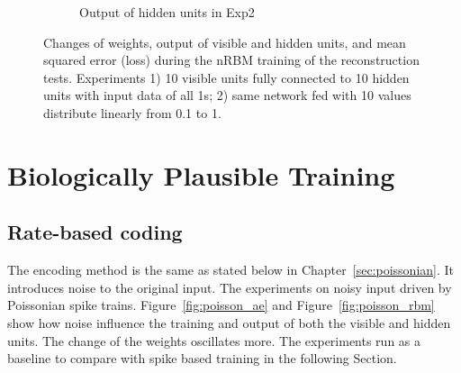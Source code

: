 \begin{figure}
\begin{subfigure}[t]{0.4\textwidth}
		\caption{Output of hidden units in Exp2}
	\end{subfigure}
	\caption{Changes of weights, output of visible and hidden units, and mean squared error (loss) during the nRBM training of the reconstruction tests. 
		Experiments 1) 10 visible units fully connected to 10 hidden units with input data of all 1s; 2) same network fed with 10 values distribute linearly from 0.1 to 1.}
\end{figure}

\section{Biologically Plausible Training}
\subsection{Rate-based coding}
The encoding method is the same as stated below in Chapter~\ref{sec:poissonian}.
It introduces noise to the original input.
The experiments on noisy input driven by Poissonian spike trains.
Figure~\ref{fig:poisson_ae} and Figure~\ref{fig:poisson_rbm} show how noise influence the training and output of both the visible and hidden units.
The change of the weights oscillates more. %
The experiments run as a baseline to compare with spike based training in the following Section.
